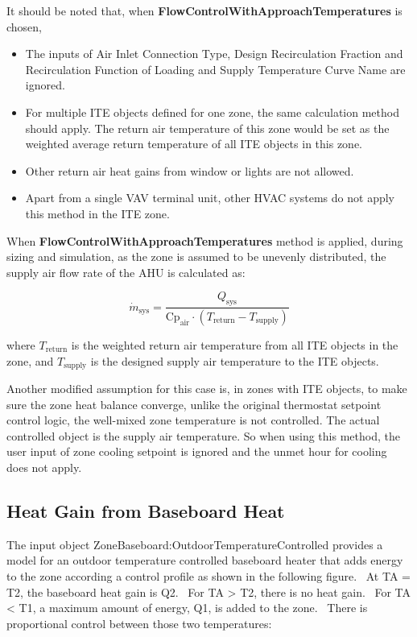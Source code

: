 It should be noted that, when \textbf{FlowControlWithApproachTemperatures} is chosen, 

\begin{itemize}
\item The inputs of Air Inlet Connection Type, Design Recirculation Fraction and Recirculation Function of Loading and Supply Temperature Curve Name are ignored.
\item For multiple ITE objects defined for one zone, the same calculation method should apply. The return air temperature of this zone would be set as the weighted average return temperature of all ITE objects in this zone.
\item Other return air heat gains from window or lights are not allowed.
\item Apart from a single VAV terminal unit, other HVAC systems do not apply this method in the ITE zone.
\end{itemize}

When \textbf{FlowControlWithApproachTemperatures} method is applied, during sizing and simulation, as the zone is assumed to be unevenly distributed, the supply air flow rate of the AHU is calculated as:

\begin{equation}
{\dot m_{\textrm{sys}}} = \frac{Q_{\textrm{sys}}}{\textrm{Cp}_{\textrm{air}} \cdot (T_{\textrm{return}} - T_{\textrm{supply}})}
\end{equation}

where $T_{\textrm{return}}$ is the weighted return air temperature from all ITE objects in the zone, and $T_{\textrm{supply}}$ is the designed supply air temperature to the ITE objects.

Another modified assumption for this case is, in zones with ITE objects, to make sure the zone heat balance converge, unlike the original thermostat setpoint control logic, the well-mixed zone temperature is not controlled. The actual controlled object is the supply air temperature. So when using this method, the user input of zone cooling setpoint is ignored and the unmet hour for cooling does not apply.

\subsection{Heat Gain from Baseboard Heat}\label{heat-gain-from-baseboard-heat}

The input object ZoneBaseboard:OutdoorTemperatureControlled provides a model for an outdoor temperature controlled baseboard heater that adds energy to the zone according a control profile as shown in the following figure.~ At TA = T2, the baseboard heat gain is Q2.~ For TA \textgreater{} T2, there is no heat gain.~ For TA \textless{} T1, a maximum amount of energy, Q1, is added to the zone.~ There is proportional control between those two temperatures:

